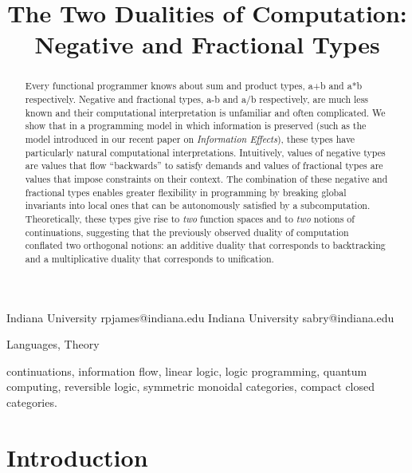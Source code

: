 \documentclass[preprint]{sigplanconf}
\begin{document}
\CopyrightYear{}
\copyrightdata{}
\titlebanner{}
\preprintfooter{}

\title{The Two Dualities of Computation: Negative and Fractional Types}
           {Indiana University}
           {rpjames@indiana.edu}
           {Indiana University}
           {sabry@indiana.edu}
\maketitle

\begin{abstract}
  Every functional programmer knows about sum and product types, {{a+b}} and
  {{a*b}} respectively. Negative and fractional types, {{a-b}} and {{a/b}}
  respectively, are much less known and their computational interpretation is
  unfamiliar and often complicated. We show that in a programming model in
  which information is preserved (such as the model introduced in our recent
  paper on \emph{Information Effects}), these types have particularly natural
  computational interpretations. Intuitively, values of negative types are
  values that flow ``backwards'' to satisfy demands and values of fractional
  types are values that impose constraints on their context.  The combination
  of these negative and fractional types enables greater flexibility in
  programming by breaking global invariants into local ones that can be
  autonomously satisfied by a subcomputation. Theoretically, these types give
  rise to \emph{two} function spaces and to \emph{two} notions of
  continuations, suggesting that the previously observed duality of
  computation conflated two orthogonal notions: an additive duality that
  corresponds to backtracking and a multiplicative duality that corresponds
  to unification.
\end{abstract}


\terms
Languages, Theory

\keywords continuations, information flow, linear logic, logic programming,
quantum computing, reversible logic, symmetric monoidal categories, compact
closed categories.

\section{Introduction}
\end{document}
